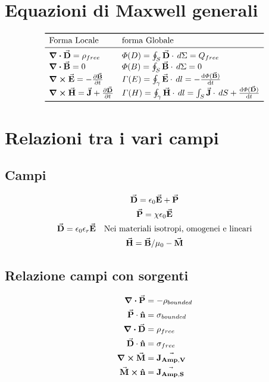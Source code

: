 \documentclass[a4paper]{article}
\begin{document}
    
\section{Equazioni di Maxwell generali}

\[
\begin{array}{ll}
    \toprule
    \text{Forma Locale} & \text {forma Globale} \\
    \midrule
    \div{\va D} = \rho_{free}             & \varPhi(D)   = \oint_S \va D \cdot \, d\Sigma= Q_{free}\\
    \div{\va B} = 0                       & \varPhi(B)   = \oint_S \va B \cdot \, d\Sigma= 0\\
    \curl{\va E}= -\pdv{\va B}{t}         & \varGamma(E) = \oint_\gamma \va E \cdot \,dl = -\dv{\varPhi(\va B)}{t}\\
    \curl{\va H}= \va J +  \pdv{\va D}{t} & \varGamma(H) = \oint_\gamma \va H \cdot \,dl = \int_S \va J \cdot \,dS + \dv{\varPhi(\va D)}{t}\\
    \bottomrule
\end{array}    
\]

\section{Relazioni tra i vari campi}

\subsection{Campi}

\begin{gather}
    \va D = \epsilon_0 \va E + \va P\\
    \va P = \chi\epsilon_0 \va E \\
    \va D = \epsilon_0 \epsilon_r \va E \quad \text{Nei materiali isotropi, omogenei e lineari}\\
    \va H = \va B/\mu_0 - \va M
\end{gather}

\subsection{Relazione campi con sorgenti}
\begin{align}
    \div {\va P} & = - \rho_{bounded}\\
    \va P \cdot  \vu n &= \sigma_{bounded}\\
    \div {\va D} &= \rho_{free}\\
    \va D \cdot  \vu n &= \sigma_{free}\\
    \curl {\va M} &= \va {J_{Amp, V}}\\
    \va M \cross \vu n &= \va {J_{Amp, S}}
\end{align}
\end{document}
